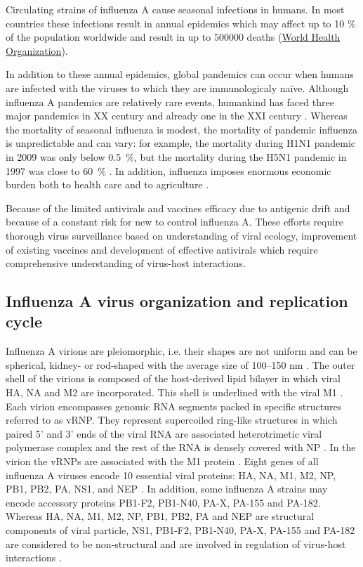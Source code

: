 	Circulating strains of influenza A cause seasonal infections in humans. In most countries these infections result in annual epidemics which may affect up to 10 \% of the population worldwide and result in up to $500000$ deaths (\hyperlink{www.who.in}{World Health Organization}). 
	
	In addition to these annual epidemics, global pandemics can occur when humans are infected with the viruses to which they are immunologicaly na\"{i}ve. Although influenza A pandemics are relatively rare events, humankind has faced three major pandemics in XX century and already one in the XXI century \parencite{Lagace-Wiens2010, Fineberg2014}.  Whereas the mortality of seasonal influenza is modest, the mortality of pandemic influenza is unpredictable and can vary: for example, the mortality during H1N1 pandemic in 2009 was only below 0.5~\%, but the mortality during the H5N1 pandemic in 1997 was close to 60~\% \parencite{Forrest2010, Noah2013}. In addition, influenza imposes enormous economic burden both to health care and to agriculture \parencite{Szucs1999, Noah2013}. 
	
	Because of the limited antivirals and vaccines efficacy due to antigenic drift and because of a constant risk for new to control influenza A. These efforts require thorough virus surveillance based on understanding of viral ecology, improvement of existing vaccines and development of effective antivirals which require comprehensive understanding of virus-host interactions.  
	
\subsection{Influenza A virus organization and replication cycle}

	Influenza A virions are pleiomorphic, i.e. their shapes are not uniform and can be spherical, kidney- or rod-shaped with the average size of 100--150 nm \parencite{Fujiyoshi1994}. The outer shell of the virions is composed of the host-derived lipid bilayer in which viral \gls{HA}, \gls{NA} and \gls{M2} are incorporated. This shell is underlined with the viral \gls{M1} \parencite{Harris2006}. Each virion encompasses genomic RNA segments packed in specific structures referred to as \gls{vRNP}. They represent supercoiled ring-like structures in which paired 5' and 3' ends of the viral RNA are associated heterotrimetic viral polymerase complex and the rest of the RNA is densely covered with \gls{NP} \parencite{Arranz2012}. In the virion the \gls{vRNP}s are associated with the \gls{M1} protein \parencite{Rees1982, Ye1999}. Eight genes of all influenza A viruses encode 10 essential viral proteins: \gls{HA}, \gls{NA}, \gls{M1}, \gls{M2}, \gls{NP}, \gls{PB1}, \gls{PB2}, \gls{PA}, \gls{NS1}, and \gls{NEP} \parencite{Lamb1983}. In addition, some influenza A strains may encode accessory proteins PB1-F2, PB1-N40, PA-X, PA-155 and PA-182. Whereas \gls{HA}, \gls{NA}, \gls{M1}, \gls{M2}, \gls{NP}, \gls{PB1}, \gls{PB2}, \gls{PA} and \gls{NEP} are structural components of viral particle, \gls{NS1}, PB1-F2, PB1-N40, PA-X, PA-155 and PA-182 are considered to be non-structural and are involved in regulation of virus-host interactions \parencite{Chen2001,Hale2008b,Wise2009,Jagger2012,Muramoto2013}.
	
